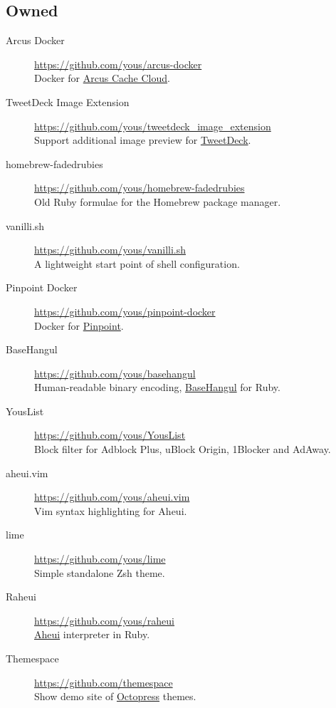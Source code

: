 \documentclass[a4paper,10pt]{article}
\begin{document}
\subsection{Owned}
\begin{description}
  \item[Arcus Docker] \url{https://github.com/yous/arcus-docker} \\
    Docker for \href{https://github.com/naver/arcus}{Arcus Cache Cloud}.
  \item[TweetDeck Image Extension] \url{https://github.com/yous/tweetdeck_image_extension} \\
    Support additional image preview for \href{https://tweetdeck.twitter.com}{TweetDeck}.
  \item[homebrew-fadedrubies] \url{https://github.com/yous/homebrew-fadedrubies} \\
    Old Ruby formulae for the Homebrew package manager.
  \item[vanilli.sh] \url{https://github.com/yous/vanilli.sh} \\
    A lightweight start point of shell configuration.
  \item[Pinpoint Docker] \url{https://github.com/yous/pinpoint-docker} \\
    Docker for \href{https://github.com/naver/pinpoint}{Pinpoint}.
  \item[BaseHangul] \url{https://github.com/yous/basehangul} \\
    Human-readable binary encoding, \href{https://basehangul.github.io}{BaseHangul} for Ruby.
  \item[YousList] \url{https://github.com/yous/YousList} \\
    Block filter for Adblock Plus, uBlock Origin, 1Blocker and AdAway.
  \item[aheui.vim] \url{https://github.com/yous/aheui.vim} \\
    Vim syntax highlighting for Aheui.
  \item[lime] \url{https://github.com/yous/lime} \\
    Simple standalone Zsh theme.
  \item[Raheui] \url{https://github.com/yous/raheui} \\
    \href{http://aheui.github.io}{Aheui} interpreter in Ruby.
  \item[Themespace] \url{https://github.com/themespace} \\
    Show demo site of \href{http://octopress.org}{Octopress} themes.
\end{description}
\end{document}
